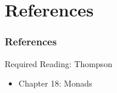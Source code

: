 \documentclass[dvipsnames]{beamer}
\theoremstyle{plain}
\begin{document}
\section*{References}

\begin{frame}
  \frametitle{References}

  \begin{block}{Required Reading: Thompson}
    \begin{itemize}
      \item Chapter 18: \alert{Monads}
    \end{itemize}
  \end{block}
\end{frame}
\end{document}
